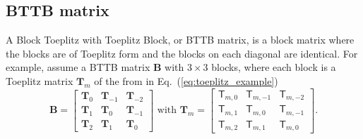 \documentclass[
pra%
,preprint%
,amssymb, nobibnotes, aps, superscriptaddress, floatfix]{revtex4}
\begin{document}
\subsection{BTTB matrix}\label{sec:app_BTTB}

A Block Toeplitz with Toeplitz Block, or BTTB matrix, is a block matrix where the blocks are of Toeplitz form and the blocks on each diagonal are identical. For example, assume a BTTB matrix $\mathbf{B}$ with $3 \times 3$ blocks, where each block is a Toeplitz matrix $\mathbf{T}_m$ of the from in Eq.~(\ref{eq:toeplitz_example})
\begin{equation}
\mathbf{B} = 
\begin{bmatrix}
\mathbf{T}_{0} & \mathbf{T}_{-1} & \mathbf{T}_{-2} \\
\mathbf{T}_{1} & \mathbf{T}_{0} & \mathbf{T}_{-1}  \\
\mathbf{T}_{2} & \mathbf{T}_{1} & \mathbf{T}_{0} 
\end{bmatrix}
\text{  with  }
\mathbf{T}_m = 
\begin{bmatrix}
\mathsf{T}_{m,0} & \mathsf{T}_{m,-1} & \mathsf{T}_{m,-2} \\
\mathsf{T}_{m,1} & \mathsf{T}_{m,0} & \mathsf{T}_{m,-1}  \\
\mathsf{T}_{m,2} & \mathsf{T}_{m,1} & \mathsf{T}_{m,0} 
\end{bmatrix} \label{eq:example_bttb}.
\end{equation}
\end{document}
